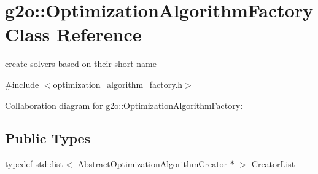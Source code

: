 \hypertarget{classg2o_1_1OptimizationAlgorithmFactory}{}\section{g2o\+:\+:Optimization\+Algorithm\+Factory Class Reference}
\label{classg2o_1_1OptimizationAlgorithmFactory}


create solvers based on their short name  




{\ttfamily \#include $<$optimization\+\_\+algorithm\+\_\+factory.\+h$>$}



Collaboration diagram for g2o\+:\+:Optimization\+Algorithm\+Factory\+:
\subsection*{Public Types}
\begin{DoxyCompactItemize}
\item 
typedef std\+::list$<$ \hyperlink{classg2o_1_1AbstractOptimizationAlgorithmCreator}{Abstract\+Optimization\+Algorithm\+Creator} $\ast$ $>$ \hyperlink{classg2o_1_1OptimizationAlgorithmFactory_a3ed210b94bf09b47e30d07da3766b4ec}{Creator\+List}
\end{DoxyCompactItemize}

